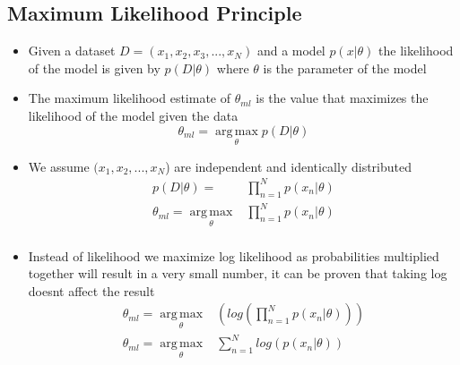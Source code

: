 \documentclass{article}
\begin{document}
\subsection{Maximum Likelihood Principle}
\begin{itemize}
    \item Given a dataset $D = (x_1, x_2, x_3, ..., x_N)$ and a model $p(x|\theta)$ the likelihood of the model is given by $p(D|\theta)$ where $\theta$ is the parameter of the model
    \item The maximum likelihood estimate of $\theta_{ml}$ is the value that maximizes the likelihood of the model given the data
          \begin{equation*} \theta_{ml} = \operatorname*{arg\,max}_\theta  p(D|\theta) \end{equation*}
    \item We assume $(x_1, x_2 , ... , x_N$) are independent and identically distributed
          \begin{align*}
              p(D|\theta) =                                 & \prod_{n=1}^{N}p(x_n|\theta) \\
              \theta_{ml} = \operatorname*{arg\,max}_\theta & \prod_{n=1}^{N}p(x_n|\theta) \\
          \end{align*}
    \item Instead of likelihood we maximize log likelihood as probabilities multiplied together will result in a very small number, it can be proven that taking log doesnt affect the result
          \begin{align*}
              \theta_{ml} = \operatorname*{arg\,max}_\theta & (log(\prod_{n=1}^{N}p(x_n|\theta))) \\
              \theta_{ml} = \operatorname*{arg\,max}_\theta & \sum_{n=1}^{N}log(p(x_n|\theta))    \\
          \end{align*}
\end{itemize}
\end{document}
